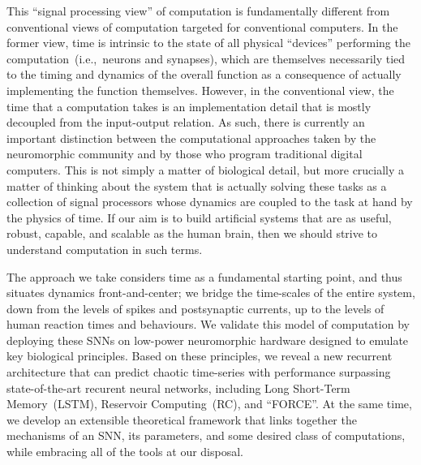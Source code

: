 This ``signal processing view'' of computation is fundamentally different from conventional views of computation targeted for conventional computers.
In the former view, time is intrinsic to the state of all physical ``devices'' performing the computation~(i.e.,~neurons and synapses), which are themselves necessarily tied to the timing and dynamics of the overall function as a consequence of actually implementing the function themselves.
However, in the conventional view, the time that a computation takes is an implementation detail that is mostly decoupled from the input-output relation.
As such, there is currently an important distinction between the computational approaches taken by the neuromorphic community and by those who program traditional digital computers.
This is not simply a matter of biological detail, but more crucially a matter of thinking about the system that is actually solving these tasks as a collection of signal processors whose dynamics are coupled to the task at hand by the physics of time.
If our aim is to build artificial systems that are as useful, robust, capable, and scalable as the human brain, then we should strive to understand computation in such terms.

The approach we take considers time as a fundamental starting point, and thus situates dynamics front-and-center; we bridge the time-scales of the entire system, down from the levels of spikes and postsynaptic currents, up to the levels of human reaction times and behaviours. 
We validate this model of computation by deploying these SNNs on low-power neuromorphic hardware designed to emulate key biological principles.
Based on these principles, we reveal a new recurrent architecture that can predict chaotic time-series with performance surpassing state-of-the-art recurent neural networks, including Long Short-Term Memory~(LSTM), Reservoir Computing~(RC), and ``FORCE''.
At the same time, we develop an extensible theoretical framework that links together the mechanisms of an SNN, its parameters, and some desired class of computations, while embracing all of the tools at our disposal.


